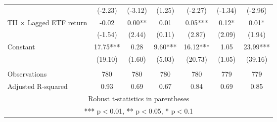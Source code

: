 \documentclass[]{article}
\begin{document}
\begin{tabular}{lcccccc}
 & (-2.23) & (-3.12) & (1.25) & (-2.27) & (-1.34) & (-2.96) \\
TII $\times$ Lagged ETF return & -0.02 & 0.00** & 0.01 & 0.05*** & 0.12* & 0.01* \\
 & (-1.54) & (2.44) & (0.11) & (2.87) & (2.09) & (1.94) \\
Constant & 17.75*** & 0.28 & 9.60*** & 16.12*** & 1.05 & 23.99*** \\
 & (19.10) & (1.60) & (5.03) & (20.73) & (1.05) & (39.16) \\
 &  &  &  &  &  &  \\
Observations & 780 & 780 & 780 & 780 & 779 & 779 \\
 Adjusted R-squared & 0.93 & 0.69 & 0.67 & 0.84 & 0.69 & 0.85 \\ \hline
\multicolumn{7}{c}{ Robust t-statistics in parentheses} \\
\multicolumn{7}{c}{ *** p$<$0.01, ** p$<$0.05, * p$<$0.1} \\
\end{tabular}
\end{document}
